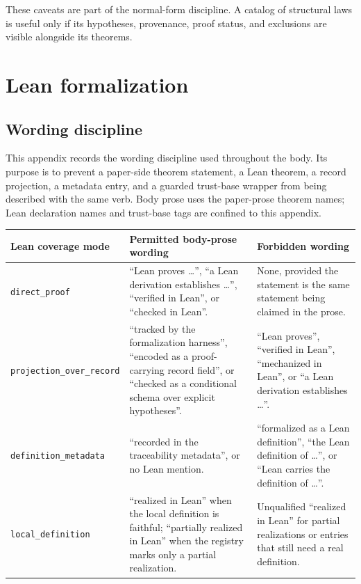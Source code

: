 \documentclass[11pt]{article}
\theoremstyle{definition}
\begin{document}
These caveats are part of the normal-form discipline. A catalog of
structural laws is useful only if its hypotheses, provenance, proof
status, and exclusions are visible alongside its theorems.
 

\appendix
\section{Lean formalization}\label{app:formalization}

\subsection{Wording discipline}\label{subsec:lean-wording-discipline}

This appendix records the wording discipline used throughout the body.
Its purpose is to prevent a paper-side theorem statement, a Lean
theorem, a record projection, a metadata entry, and a guarded
trust-base wrapper from being described with the same verb. Body prose
uses the paper-prose theorem names; Lean declaration names and trust-base
tags are confined to this appendix.

\begin{center}
\small
\begin{tabularx}{\textwidth}{@{}
    >{\raggedright\arraybackslash}p{}
    >{\raggedright\arraybackslash}X
    >{\raggedright\arraybackslash}X@{}}
  \toprule
  Lean coverage mode & Permitted body-prose wording & Forbidden wording \\
  \midrule
  \texttt{direct\_proof} &
  ``Lean proves \ldots'', ``a Lean derivation establishes \ldots'',
  ``verified in Lean'', or ``checked in Lean''. &
  None, provided the statement is the same statement being claimed in
  the prose. \\
  \texttt{projection\_over\_record} &
  ``tracked by the formalization harness'', ``encoded as a
  proof-carrying record field'', or ``checked as a conditional schema
  over explicit hypotheses''. &
  ``Lean proves'', ``verified in Lean'', ``mechanized in Lean'', or
  ``a Lean derivation establishes \ldots''. \\
  \texttt{definition\_metadata} &
  ``recorded in the traceability metadata'', or no Lean mention. &
  ``formalized as a Lean definition'', ``the Lean definition of
  \ldots'', or ``Lean carries the definition of \ldots''. \\
  \texttt{local\_definition} &
  ``realized in Lean'' when the local definition is faithful; ``partially
  realized in Lean'' when the registry marks only a partial
  realization. &
  Unqualified ``realized in Lean'' for partial realizations or entries
  that still need a real definition. \\
  \bottomrule
\end{tabularx}
\end{center}
\end{document}
